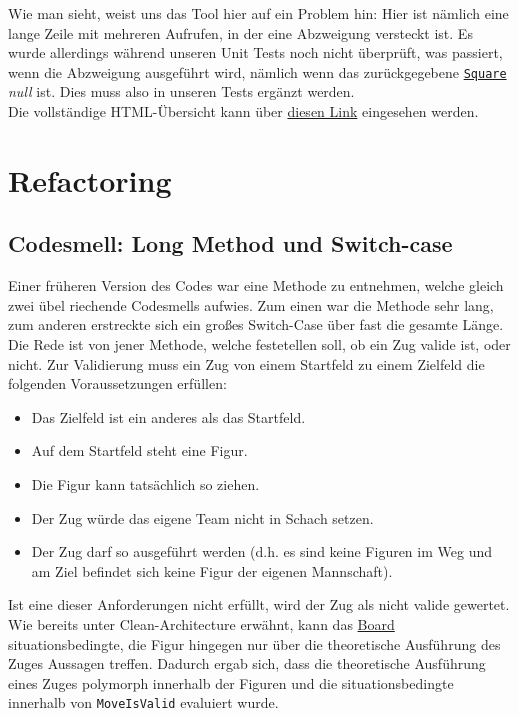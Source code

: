 \documentclass[
10pt, %
a4paper, %
oneside, %
headinclude,footinclude, %
BCOR5mm, %
]{scrartcl}
\begin{document}
\begin{onehalfspace}
Wie man sieht, weist uns das Tool hier auf ein Problem hin: Hier ist nämlich eine lange Zeile mit mehreren Aufrufen, in der eine Abzweigung versteckt ist. Es wurde allerdings während unseren Unit Tests noch nicht überprüft, was passiert, wenn die Abzweigung ausgeführt wird, nämlich wenn das zurückgegebene \texttt{\href{https://github.com/schmida736/Chess-AdvancedSE/blob/main/Chess-AdvancedSE/Game\%20Elements/Square.cs}{Square}} \textsl{null} ist. Dies muss also in unseren Tests ergänzt werden.
\\
Die vollständige HTML-Übersicht kann über \href{https://github.com/schmida736/Chess-AdvancedSE/tree/main/Chess-AdvancedSE.Tests/coverage%20results}{diesen Link} eingesehen werden.

\newpage
\section{Refactoring}
\subsection{Codesmell: Long Method und Switch-case}
Einer früheren Version des Codes war eine Methode zu entnehmen, welche gleich zwei übel riechende Codesmells aufwies. Zum einen war die Methode sehr lang, zum anderen erstreckte sich ein großes Switch-Case über fast die gesamte Länge. Die Rede ist von jener Methode, welche festetellen soll, ob ein Zug valide ist, oder nicht. Zur Validierung muss ein Zug von einem Startfeld zu einem Zielfeld die folgenden Voraussetzungen erfüllen:
\begin{center}
	\begin{itemize}
		\item Das Zielfeld ist ein anderes als das Startfeld.
		\item Auf dem Startfeld steht eine Figur.
		\item Die Figur kann tatsächlich so ziehen.
		\item Der Zug würde das eigene Team nicht in Schach setzen.
		\item Der Zug darf so ausgeführt werden (d.h. es sind keine Figuren im Weg und am Ziel befindet sich keine Figur der eigenen Mannschaft).
	\end{itemize}
\end{center}
Ist eine dieser Anforderungen nicht erfüllt, wird der Zug als nicht valide gewertet. Wie bereits unter Clean-Architecture erwähnt, kann das \href{https://github.com/schmida736/Chess-AdvancedSE/blob/main/Chess-AdvancedSE/Game\%20Elements/Board.cs}{Board} situationsbedingte, die Figur hingegen nur über die theoretische Ausführung des Zuges Aussagen treffen. Dadurch ergab sich, dass die theoretische Ausführung eines Zuges polymorph innerhalb der Figuren und die situationsbedingte innerhalb von \texttt{MoveIsValid} evaluiert wurde. 
\vspace{0.5cm}


\end{onehalfspace}
\end{document}
